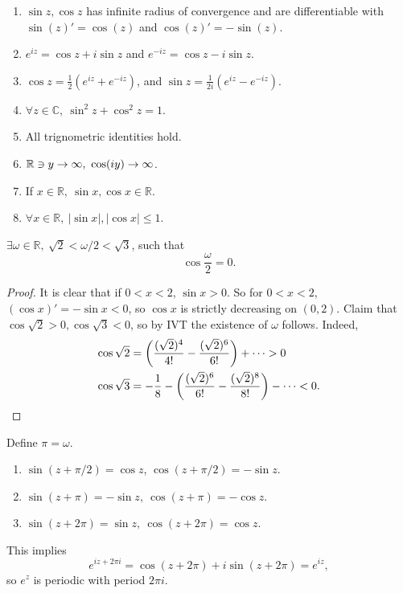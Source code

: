 \begin{sprop}
    \begin{enumerate}
        \item     $ \sin z,\cos z $ has infinite radius of convergence and are differentiable with $ \sin(z)'= \cos(z) $ and $ \cos(z)'=-\sin (z) $.
        \item $ e^{iz}=\cos z+i \sin z $ and $ e^{-iz}=\cos z-i \sin z $.
        \item $\displaystyle \cos z=\frac{1}{2}\left( e^{iz}+e^{-iz} \right)$, and $\displaystyle \sin z = \frac{1}{2i}\left( e^{iz}-e^{-iz} \right)$. 
        \item $\forall z\in \mathbb{C},\ \sin ^2 z+ \cos ^2 z=1 $.
        \item All trignometric identities hold.
        \item $ {\mathbb{R}}\ni y\to \infty,\ \cos(iy)\to \infty $.
        \item If $ x\in \mathbb{R},\ \sin x, \cos x\in \mathbb{R} $.
        \item $ \forall x\in \mathbb{R},\ |\sin x|,|\cos x|\le 1 $.
    \end{enumerate}
\end{sprop}

\begin{proposition}\label{prop:4.10}
    $ \exists \omega\in \mathbb{R},\ \sqrt{2}<\omega/2<\sqrt{3} $, such that 
    \[
        \cos \frac{\omega}{2}=0.
    \]
\end{proposition}
\begin{proof}
    It is clear that if $0<x<2$, $ \sin x>0 $. So for $0<x<2$, $ (\cos x)'=- \sin x<0 $, so $\cos x$ is strictly decreasing on $ (0,2) $. Claim that $ \cos \sqrt{2}>0, \cos \sqrt{3}<0 $, so by IVT the existence of $ \omega $ follows. Indeed, 
    \begin{align*}
        \cos \sqrt{2}&= \left( \frac{(\sqrt{2})^4}{4!}- \frac{(\sqrt{2})^6}{6!}\right)+\cdots>0\\ 
        \cos \sqrt{3}&= -\frac{1}{8}- \left( \frac{(\sqrt{2})^6}{6!}-\frac{(\sqrt{2})^8}{8!} \right)- \cdots <0.\qedhere
    \end{align*}
\end{proof}

\begin{definition}
    Define $ \pi=\omega $.
\end{definition}

\begin{theorem}\label{thm:4.12}
    \begin{enumerate}
        \item $ \sin (z+\pi/2)=\cos z $, $ \cos (z+\pi/2)=-\sin z $.
        \item $ \sin (z+\pi)=-\sin z,\ \cos (z+\pi)=-\cos z $.
        \item $ \sin (z+2\pi)=\sin z,\ \cos (z+2\pi)=\cos z $.
    \end{enumerate}
\end{theorem}

This implies 
\[
    e^{iz+2\pi i}=\cos (z+2\pi)+i \sin (z+2\pi)= e^{iz},
\]
so $e^z$ is periodic with period $ 2\pi i $.